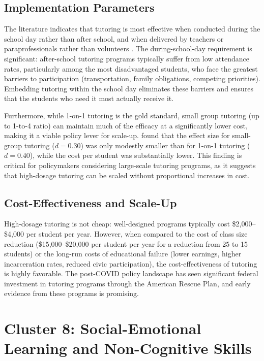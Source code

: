 \documentclass[12pt,letterpaper]{article}
\begin{document}
\subsection{Implementation Parameters}

The literature indicates that tutoring is most effective when conducted during the school day rather than after school, and when delivered by teachers or paraprofessionals rather than volunteers \citep{kraft2021}. The during-school-day requirement is significant: after-school tutoring programs typically suffer from low attendance rates, particularly among the most disadvantaged students, who face the greatest barriers to participation (transportation, family obligations, competing priorities). Embedding tutoring within the school day eliminates these barriers and ensures that the students who need it most actually receive it.

Furthermore, while 1-on-1 tutoring is the gold standard, small group tutoring (up to 1-to-4 ratio) can maintain much of the efficacy at a significantly lower cost, making it a viable policy lever for scale-up. \citet{nickow2020} found that the effect size for small-group tutoring ($d = 0.30$) was only modestly smaller than for 1-on-1 tutoring ($d = 0.40$), while the cost per student was substantially lower. This finding is critical for policymakers considering large-scale tutoring programs, as it suggests that high-dosage tutoring can be scaled without proportional increases in cost.

\subsection{Cost-Effectiveness and Scale-Up}

High-dosage tutoring is not cheap: well-designed programs typically cost \$2,000--\$4,000 per student per year. However, when compared to the cost of class size reduction (\$15,000--\$20,000 per student per year for a reduction from 25 to 15 students) or the long-run costs of educational failure (lower earnings, higher incarceration rates, reduced civic participation), the cost-effectiveness of tutoring is highly favorable. The post-COVID policy landscape has seen significant federal investment in tutoring programs through the American Rescue Plan, and early evidence from these programs is promising.

\section{Cluster 8: Social-Emotional Learning and Non-Cognitive Skills}
\end{document}
